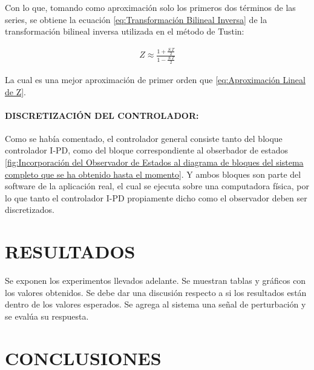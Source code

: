 \documentclass{article}
\begin{document}
\begin{sloppypar}
Con lo que, tomando como aproximación solo los primeros dos términos de las series, se obtiene la ecuación \ref{eq:Transformación Bilineal Inversa} de la transformación bilineal inversa utilizada en el método de Tustin:

\begin{align}   \label{eq:Transformación Bilineal Inversa Demostrada}
    Z \approx \frac{1+\frac{S.T}{2}}{1-\frac{S.T}{2}}
\end{align}

La cual es una mejor aproximación de primer orden que \ref{eq:Aproximación Lineal de Z}.


\paragraph{DISCRETIZACIÓN DEL CONTROLADOR:}
\label{sec:DISCRETIZACIÓN DEL CONTROLADOR:}
\hfill

\hfill

Como se había comentado, el controlador general consiste tanto del bloque controlador I-PD, como del bloque correspondiente al obserbador de estados \ref{fig:Incorporación del Observador de Estados al diagrama de bloques del sistema completo que se ha obtenido hasta el momento}. Y ambos bloques son parte del software de la aplicación real, el cual se ejecuta sobre una computadora física, por lo que tanto el controlador I-PD propiamente dicho como el observador deben ser discretizados.










\section{RESULTADOS}
\label{sec:RESULTADOS}

Se exponen los experimentos llevados adelante. Se muestran tablas y gráficos con los valores obtenidos. Se debe dar una discusión respecto a si los resultados están dentro de los valores esperados. Se agrega al sistema una señal de perturbación y se evalúa su respuesta.



\section{CONCLUSIONES}
\label{sec:CONCLUSIONES}


\end{sloppypar}
\end{document}
